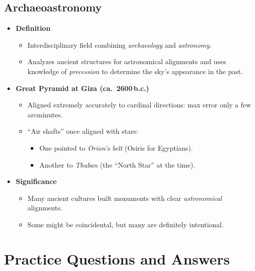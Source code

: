 \subsection{Archaeoastronomy}
\begin{itemize}
  \item \textbf{Definition}
  \begin{itemize}
    \item Interdisciplinary field combining \emph{archaeology} and \emph{astronomy}.
    \item Analyzes ancient structures for astronomical alignments and uses knowledge of \emph{precession} to determine the sky’s appearance in the past.
  \end{itemize}
  \item \textbf{Great Pyramid at Giza (ca.\ 2600\,b.c.)}
  \begin{itemize}
    \item Aligned extremely accurately to cardinal directions: max error only a few arcminutes.
    \item ``Air shafts'' once aligned with stars:
    \begin{itemize}
      \item One pointed to \emph{Orion’s belt} (Osiris for Egyptians).
      \item Another to \emph{Thuban} (the ``North Star'' at the time).
    \end{itemize}
  \end{itemize}
  \item \textbf{Significance}
  \begin{itemize}
    \item Many ancient cultures built monuments with clear \emph{astronomical} alignments.
    \item Some might be coincidental, but many are definitely intentional.
  \end{itemize}
\end{itemize}

\section{Practice Questions and Answers}


